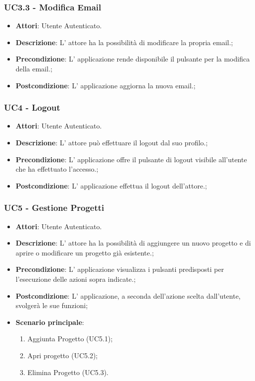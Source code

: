\subsubsection{UC3.3 - Modifica Email} 
\label{sssec:UC3.3} 
\begin{itemize} 
\item \textbf{Attori}: Utente Autenticato.
\item \textbf{Descrizione}: L' attore ha la possibilità di modificare la propria email.;
\item \textbf{Precondizione}: L' applicazione rende disponibile il pulsante per la modifica della email.;
\item \textbf{Postcondizione}: L' applicazione aggiorna la nuova email.;
\end{itemize} 
\subsubsection{UC4 - Logout} 
\label{sssec:UC4} 
\begin{itemize} 
\item \textbf{Attori}: Utente Autenticato.
\item \textbf{Descrizione}: L' attore può effettuare il logout dal suo profilo.;
\item \textbf{Precondizione}: L' applicazione offre il pulsante di logout visibile all'utente che ha effettuato l'accesso.;
\item \textbf{Postcondizione}: L' applicazione effettua il logout dell'attore.;
\end{itemize} 
\subsubsection{UC5 - Gestione Progetti} 
\label{sssec:UC5} 
\begin{itemize} 
\item \textbf{Attori}: Utente Autenticato.
\item \textbf{Descrizione}: L’ attore ha la possibilità di aggiungere un nuovo progetto e di aprire o modificare un progetto già esistente.;
\item \textbf{Precondizione}: L’ applicazione visualizza i pulsanti predisposti per l’esecuzione delle azioni sopra indicate.;
\item \textbf{Postcondizione}: L’ applicazione, a seconda dell’azione scelta dall’utente, svolgerà le sue funzioni;
\item \textbf{Scenario principale}: \begin{enumerate}\item Aggiunta Progetto (UC5.1);\item Apri progetto (UC5.2);\item Elimina Progetto (UC5.3). 
 \end{enumerate}
\end{itemize} 
